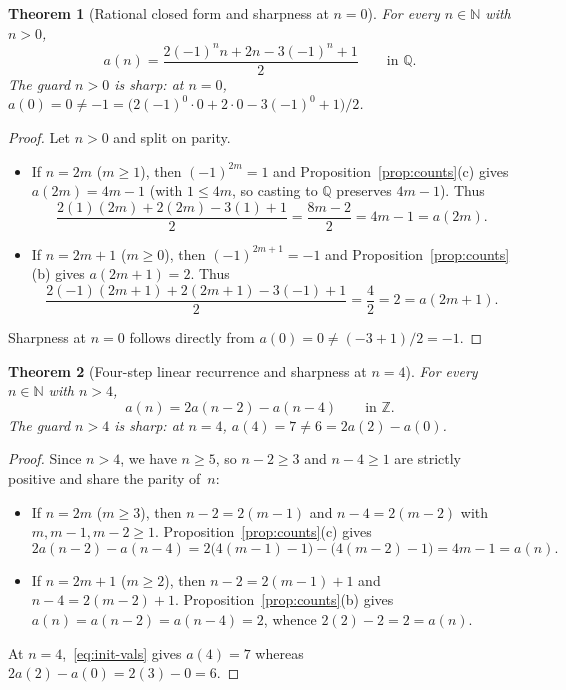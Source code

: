 \documentclass[11pt]{article}
\newtheorem{theorem}{Theorem}[section]
\theoremstyle{definition}
\newcommand{\N}{\mathbb{N}}
\newcommand{\Z}{\mathbb{Z}}
\newcommand{\Q}{\mathbb{Q}}
\begin{document}
\begin{theorem}[Rational closed form and sharpness at $n = 0$]
\label{thm:closed-form}
For every $n \in \N$ with $n > 0$,
\[
a(n) = \frac{2(-1)^n n + 2n - 3(-1)^n + 1}{2} \qquad \text{in }\Q.
\]
The guard $n > 0$ is sharp: at $n = 0$, $a(0) = 0 \ne -1 = \bigl(2(-1)^0 \cdot 0 + 2 \cdot 0 - 3(-1)^0 + 1\bigr)/2$.
\end{theorem}

\begin{proof}
Let $n > 0$ and split on parity.
\begin{itemize}
\item If $n = 2m$ ($m \ge 1$), then $(-1)^{2m} = 1$ and Proposition~\ref{prop:counts}(c) gives $a(2m) = 4m - 1$ (with $1 \le 4m$, so casting to $\Q$ preserves $4m - 1$). Thus
\[
\frac{2(1)(2m) + 2(2m) - 3(1) + 1}{2} = \frac{8m - 2}{2} = 4m - 1 = a(2m).
\]
\item If $n = 2m + 1$ ($m \ge 0$), then $(-1)^{2m+1} = -1$ and Proposition~\ref{prop:counts}(b) gives $a(2m + 1) = 2$. Thus
\[
\frac{2(-1)(2m + 1) + 2(2m + 1) - 3(-1) + 1}{2} = \frac{4}{2} = 2 = a(2m + 1).
\]
\end{itemize}
Sharpness at $n = 0$ follows directly from $a(0) = 0 \ne (-3 + 1)/2 = -1$.
\end{proof}

\begin{theorem}[Four-step linear recurrence and sharpness at $n = 4$]
\label{thm:recurrence}
For every $n \in \N$ with $n > 4$,
\[
a(n) = 2a(n - 2) - a(n - 4) \qquad \text{in }\Z.
\]
The guard $n > 4$ is sharp: at $n = 4$, $a(4) = 7 \ne 6 = 2a(2) - a(0)$.
\end{theorem}

\begin{proof}
Since $n > 4$, we have $n \ge 5$, so $n - 2 \ge 3$ and $n - 4 \ge 1$ are strictly positive and share the parity of~$n$:
\begin{itemize}
\item If $n = 2m$ ($m \ge 3$), then $n - 2 = 2(m - 1)$ and $n - 4 = 2(m - 2)$ with $m, m - 1, m - 2 \ge 1$. Proposition~\ref{prop:counts}(c) gives
\[
2a(n - 2) - a(n - 4) = 2\bigl(4(m - 1) - 1\bigr) - \bigl(4(m - 2) - 1\bigr) = 4m - 1 = a(n).
\]
\item If $n = 2m + 1$ ($m \ge 2$), then $n - 2 = 2(m - 1) + 1$ and $n - 4 = 2(m - 2) + 1$. Proposition~\ref{prop:counts}(b) gives $a(n) = a(n - 2) = a(n - 4) = 2$, whence $2(2) - 2 = 2 = a(n)$.
\end{itemize}
At $n = 4$,~\eqref{eq:init-vals} gives $a(4) = 7$ whereas $2a(2) - a(0) = 2(3) - 0 = 6$.
\end{proof}
\end{document}
